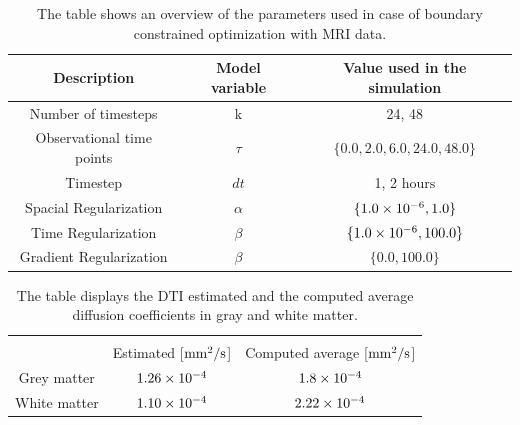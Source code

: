 \documentclass[12pt,a4paper]{article}
\begin{document}
\begin{table}\centering
\begin{tabular}{|ccc|}
\hline
Description & Model variable  & Value used in the simulation\\
\hline

Number of timesteps &  k	 & 24, 48	\\

\hline

Observational time points  & $\tau$ &  $\lbrace 0.0 ,2.0 , 6.0 , 24.0, 48.0 \rbrace$	 \\

\hline

Timestep & $dt$	 	   &	  1, 2 $\mathrm{hours}$	\\ 

\hline

Spacial Regularization & $\alpha$	   &	  $\lbrace 1.0\times10\sp{-6}, 1.0\rbrace$\\ 

\hline

Time Regularization   & $\beta$	   &	 $\lbrace 1.0\times10\sp{-6}, 100.0\rbrace$	\\ 

\hline

Gradient Regularization   & $\beta$	   &	 $\lbrace 0.0, 100.0\rbrace$	\\ 
\end{tabular}
\caption{The table shows an overview of the parameters used in case of boundary constrained optimization with MRI data. }
\label{model-params-overview}
\end{table}


\begin{table}\centering
\begin{tabular}{|ccc|}
\hline
& & \\[-2ex]
 & Estimated [$\mathrm{mm\sp{2}/s}$]& Computed average [$\mathrm{mm\sp{2}/s}$]\\[1ex]
\hline
Grey matter  & $ 1.26\times 10\sp{-4}$   &  $1.8\times 10\sp{-4}$  \\
White matter & $ 1.10\times 10\sp{-4}$   &  $2.22\times 10\sp{-4}$  \\
\hline
\end{tabular}
\caption{The table displays the DTI estimated and the computed average diffusion coefficients in gray and white matter.}
\label{Tablesummerized}
\end{table}
\end{document}
